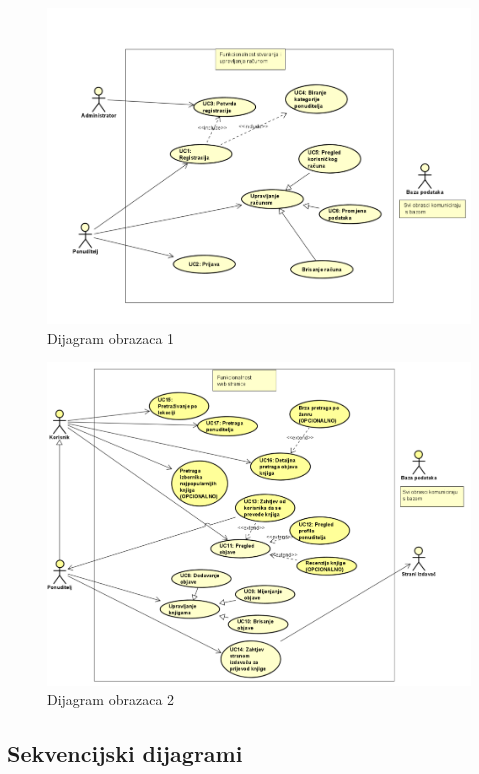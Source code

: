 				\begin{figure}[H]
    					\centering
    					\includegraphics[width = \textwidth]{slike/DO1}
    					\caption{Dijagram obrazaca 1}
    					\label{fig:Dijagram obrazaca 1}
				\end{figure}

				\begin{figure}
    					\centering
    					\includegraphics[width = \textwidth]{slike/DO2}
    					\caption{Dijagram obrazaca 2}
    					\label{fig:Dijagram obrazaca 2}
				\end{figure}
				\eject	
					
	
				
			\subsection{Sekvencijski dijagrami}
				
